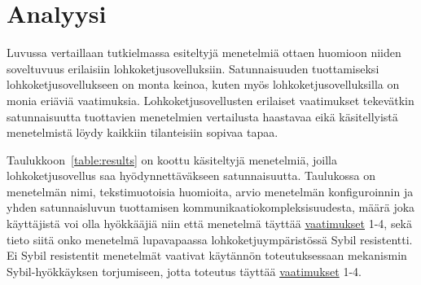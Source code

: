 \chapter{Analyysi\label{discussion}}

Luvussa vertaillaan tutkielmassa esiteltyjä menetelmiä ottaen huomioon niiden soveltuvuus erilaisiin lohkoketjusovelluksiin. Satunnaisuuden tuottamiseksi lohkoketjusovellukseen on monta keinoa, kuten myös lohkoketjusovelluksilla on monia eriäviä vaatimuksia. Lohkoketjusovellusten erilaiset vaatimukset tekevätkin satunnaisuutta tuottavien menetelmien vertailusta haastavaa eikä käsitellyistä menetelmistä löydy kaikkiin tilanteisiin sopivaa tapaa. 

Taulukkoon~\ref{table:results} on koottu käsiteltyjä menetelmiä, joilla lohkoketjusovellus saa hyödynnettäväkseen satunnaisuutta. Taulukossa on menetelmän nimi, tekstimuotoisia huomioita, arvio menetelmän konfiguroinnin ja yhden satunnaisluvun tuottamisen kommunikaatiokompleksisuudesta, määrä joka käyttäjistä voi olla hyökkääjiä niin että menetelmä täyttää \hyperref[vaatimukset]{vaatimukset} 1-4, sekä tieto siitä onko menetelmä lupavapaassa lohkoketjuympäristössä Sybil resistentti. Ei Sybil resistentit menetelmät vaativat käytännön toteutuksessaan mekanismin Sybil-hyökkäyksen torjumiseen, jotta toteutus täyttää \hyperref[vaatimukset]{vaatimukset} 1-4.

